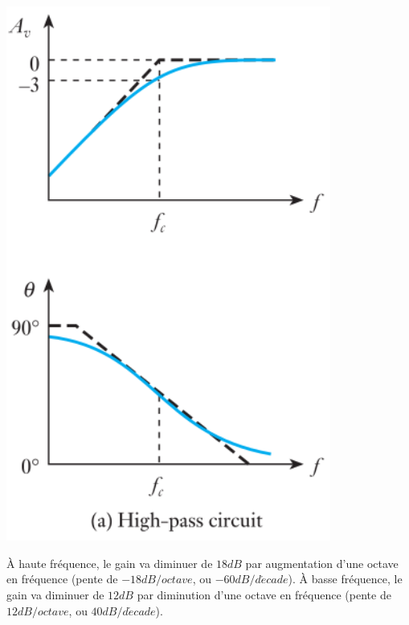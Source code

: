 \documentclass{../template/tp}
\begin{document}
{\begin{minipage}{0.45\linewidth}
\begin{center}
		\end{center}
	\end{minipage}
	\begin{minipage}{0.45\linewidth}
		\begin{center}
			\includegraphics[width=0.8\textwidth]{storey-fig-8-14-a.png}
		\end{center}
	\end{minipage}

}

{
À haute fréquence, le gain va diminuer de $18dB$ par augmentation d'une octave en fréquence (pente de $-18dB/octave$, ou $-60dB/d\acute ecade$). À basse fréquence, le gain va diminuer de $12dB$ par diminution d'une octave en fréquence (pente de $12dB/octave$, ou $40dB/d\acute ecade$).
}
\end{document}
